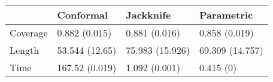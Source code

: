 \begin{tabular}{|l|l|l|l|}
\hline
& Conformal & Jackknife & Parametric \\
\hline
Coverage & 0.882 (0.015) & 0.881 (0.016) & 0.858 (0.019) \\
\hline
Length & 53.544 (12.65) & 75.983 (15.926) & 69.309 (14.757) \\
\hline
Time & 167.52 (0.019) & 1.092 (0.001) & 0.415 (0) \\
\hline
\end{tabular}
